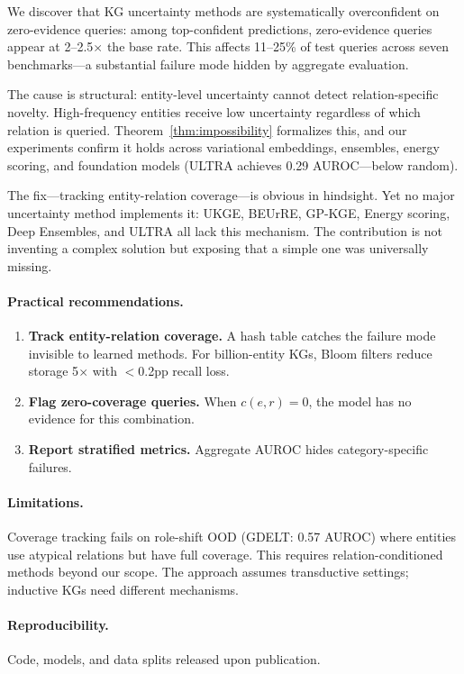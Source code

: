 
We discover that KG uncertainty methods are systematically overconfident on zero-evidence queries: among top-confident predictions, zero-evidence queries appear at 2--2.5$\times$ the base rate. This affects 11--25\% of test queries across seven benchmarks---a substantial failure mode hidden by aggregate evaluation.

The cause is structural: entity-level uncertainty cannot detect relation-specific novelty. High-frequency entities receive low uncertainty regardless of which relation is queried. Theorem~\ref{thm:impossibility} formalizes this, and our experiments confirm it holds across variational embeddings, ensembles, energy scoring, and foundation models (ULTRA achieves 0.29 AUROC---below random).

The fix---tracking entity-relation coverage---is obvious in hindsight. Yet no major uncertainty method implements it: UKGE, BEUrRE, GP-KGE, Energy scoring, Deep Ensembles, and ULTRA all lack this mechanism. The contribution is not inventing a complex solution but exposing that a simple one was universally missing.

\paragraph{Practical recommendations.}
\begin{enumerate}
\item \textbf{Track entity-relation coverage.} A hash table catches the failure mode invisible to learned methods. For billion-entity KGs, Bloom filters reduce storage 5$\times$ with $<$0.2pp recall loss.
\item \textbf{Flag zero-coverage queries.} When $c(e,r)=0$, the model has no evidence for this combination.
\item \textbf{Report stratified metrics.} Aggregate AUROC hides category-specific failures.
\end{enumerate}

\paragraph{Limitations.}
Coverage tracking fails on role-shift OOD (GDELT: 0.57 AUROC) where entities use atypical relations but have full coverage. This requires relation-conditioned methods beyond our scope. The approach assumes transductive settings; inductive KGs need different mechanisms.

\paragraph{Reproducibility.}
Code, models, and data splits released upon publication.

